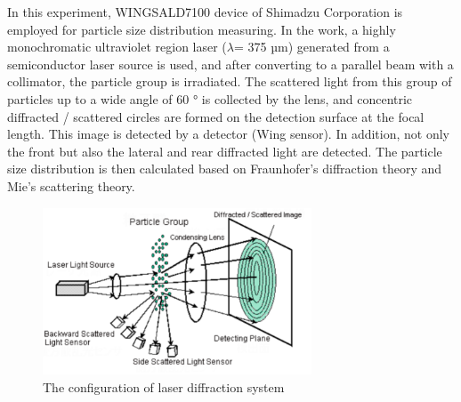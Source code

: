 In this experiment, WINGSALD7100 device of  Shimadzu Corporation is employed for particle size distribution measuring. In the work, a highly monochromatic ultraviolet region laser ($\lambda$= 375 µm) generated from a semiconductor laser source is used, and after converting to a parallel beam with a collimator, the particle group is irradiated. The scattered light from this group of particles up to a wide angle of 60 ° is collected by the lens, and concentric diffracted / scattered circles are formed on the detection surface at the focal length. This image is detected by a detector (Wing sensor). In addition, not only the front but also the lateral and rear diffracted light are detected. The particle size distribution is then calculated based on Fraunhofer’s diffraction theory and Mie’s scattering theory.
\begin{figure}[h]
\centering
\includegraphics[width=8cm]{src/fig/fig27.png}
\caption{The configuration of laser diffraction system}
\end{figure}

